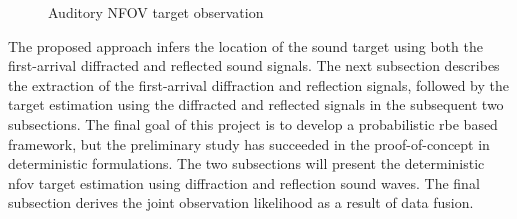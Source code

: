 \documentclass[letterpaper, 10 pt, conference]{ieeeconf}  %
\begin{document}
\begin{figure}[ht]
	\centering
	\caption{Auditory NFOV target observation}
	\label{fig:auditory_approach}
\end{figure}

The proposed approach infers the location of the sound target using both the first-arrival diffracted and reflected sound signals.  The next subsection describes the extraction of the first-arrival diffraction and reflection signals, followed by the target estimation using the diffracted and reflected signals in the subsequent two subsections.  The final goal of this project is to develop a probabilistic \gls{rbe} based framework, but the preliminary study has succeeded in the proof-of-concept in deterministic formulations.  The two subsections will present the deterministic \gls{nfov} target estimation using diffraction and reflection sound waves.  The final subsection derives the joint observation likelihood as a result of data fusion.  
\end{document}
